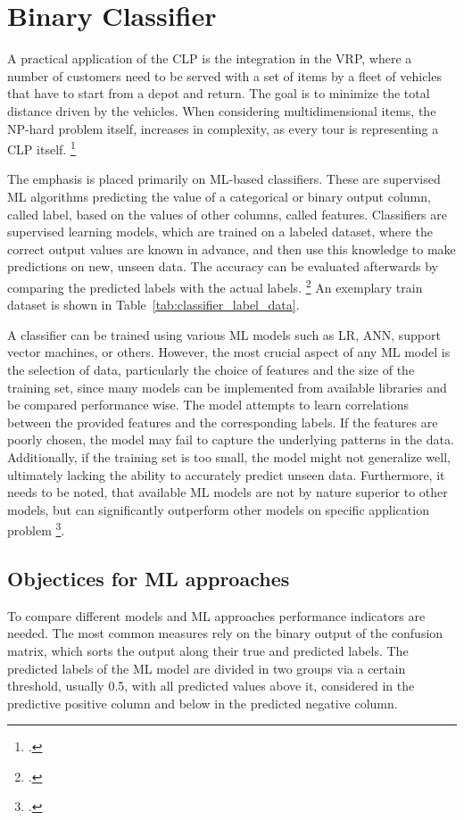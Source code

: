 \chapter{Binary Classifier}
\label{chap:classifier}

A practical application of the \gls{CLP} is the integration in the \gls{VRP}, where
a number of customers need to be served with a set of items by a fleet of vehicles that have
to start from a depot and return. The goal is to minimize the total distance driven
by the vehicles. When considering multidimensional items, the NP-hard problem itself,
increases in complexity, as every tour is representing a \gls{CLP} itself. \footcite[cf.][pp. 1--2]{tamke_branch-and-cut_2024}

The emphasis is placed primarily on \gls{ML}-based classifiers.
These are supervised \gls{ML} algorithms predicting the
value of a categorical or binary output column, called label, based on the
values of other columns, called features. Classifiers are supervised learning models,
which are trained on a labeled dataset,
where the correct output values are known in advance, and then use this knowledge to
make predictions on new, unseen data. The accuracy can be evaluated afterwards by comparing
the predicted labels with the actual labels. \footcite[cf.][]{kotsiantis_supervised_2007}
An exemplary train dataset is shown in Table~\ref{tab:classifier_label_data}.



A classifier can be trained using various \gls{ML} models such as \gls{LR},
\gls{ANN}, support vector machines, or others. However, the most crucial aspect of any
\gls{ML} model is the selection of data, particularly the choice of features and
the size of the training set, since many models can be implemented from available
libraries and be compared performance wise. The model attempts to learn correlations between the provided features
and the corresponding labels. If the features are poorly chosen, the model may fail
to capture the underlying patterns in the data. Additionally, if the training set
is too small, the model might not generalize well, ultimately lacking the ability
to accurately predict unseen data. Furthermore, it needs to be noted, that available
\gls{ML} models are not by nature superior to other models, but can significantly outperform
other models on specific application problem \footcite[cf.][pp. 250, 264]{kotsiantis_supervised_2007}.


\section{Objectices for ML approaches}
\label{sec:classifier_objectives}
To compare different models and \gls{ML} approaches performance indicators are needed. The most common
measures rely on the binary output of the confusion matrix, which sorts the output along
their true and predicted labels. The predicted labels of the \gls{ML} model are
divided in two groups via a certain threshold, usually 0.5, with all predicted values above it,
considered in the predictive positive column and below in the predicted negative column.

